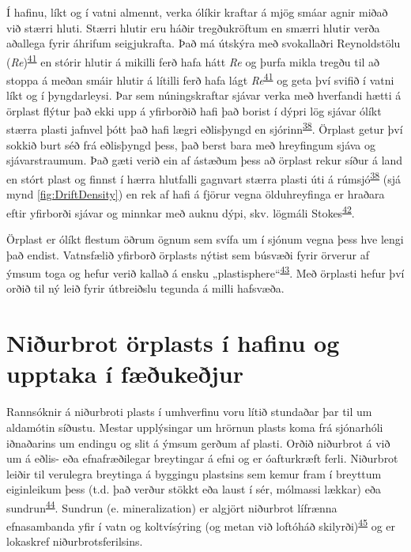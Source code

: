 \documentclass[icelandic,]{book}
\begin{document}
Í hafinu, líkt og í vatni almennt, verka ólíkir kraftar á mjög smáar agnir miðað við stærri hluti. Stærri hlutir eru háðir tregðukröftum en smærri hlutir verða aðallega fyrir áhrifum seigjukrafta. Það má útskýra með svokallaðri Reynoldstölu (\emph{Re})\textsuperscript{\protect\hyperlink{ref-levinton1995marine}{41}} en stórir hlutir á mikilli ferð hafa hátt \emph{Re} og þurfa mikla tregðu til að stoppa á meðan smáir hlutir á lítilli ferð hafa lágt \emph{Re}\textsuperscript{\protect\hyperlink{ref-levinton1995marine}{41}} og geta því svifið í vatni líkt og í þyngdarleysi. Þar sem núningskraftar sjávar verka með hverfandi hætti á örplast flýtur það ekki upp á yfirborðið hafi það borist í dýpri lög sjávar ólíkt stærra plasti jafnvel þótt það hafi lægri eðlisþyngd en sjórinn\textsuperscript{\protect\hyperlink{ref-isobe2014selective}{38}}. Örplast getur því sokkið burt séð frá eðlisþyngd þess, það berst bara með hreyfingum sjáva og sjávarstraumum. Það gæti verið ein af ástæðum þess að örplast rekur síður á land en stórt plast og finnst í hærra hlutfalli gagnvart stærra plasti úti á rúmsjó\textsuperscript{\protect\hyperlink{ref-isobe2014selective}{38}} (sjá mynd \ref{fig:DriftDensity}) en rek af hafi á fjörur vegna ölduhreyfinga er hraðara eftir yfirborði sjávar og minnkar með auknu dýpi, skv. lögmáli Stokes\textsuperscript{\protect\hyperlink{ref-stokes1851effect}{42}}.

Örplast er ólíkt flestum öðrum ögnum sem svífa um í sjónum vegna þess hve lengi það endist. Vatnsfælið yfirborð örplasts nýtist sem búsvæði fyrir örverur af ýmsum toga og hefur verið kallað á ensku „plastisphere``\textsuperscript{\protect\hyperlink{ref-Zettler2013}{43}}. Með örplasti hefur því orðið til ný leið fyrir útbreiðslu tegunda á milli hafsvæða.

\hypertarget{niurbrot-orplasts-i-hafinu-og-upptaka-i-fukejur}{%
\section*{Niðurbrot örplasts í hafinu og upptaka í fæðukeðjur}\label{niurbrot-orplasts-i-hafinu-og-upptaka-i-fukejur}}

Rannsóknir á niðurbroti plasts í umhverfinu voru lítið stundaðar þar til um aldamótin síðustu. Mestar upplýsingar um hrörnun plasts koma frá sjónarhóli iðnaðarins um endingu og slit á ýmsum gerðum af plasti.
Orðið niðurbrot á við um á eðlis- eða efnafræðilegar breytingar á efni og er óafturkræft ferli. Niðurbrot leiðir til verulegra breytinga á byggingu plastsins sem kemur fram í breyttum eiginleikum þess (t.d. það verður stökkt eða laust í sér, mólmassi lækkar) eða sundrun\textsuperscript{\protect\hyperlink{ref-ISO472}{44}}. Sundrun (e. mineralization) er algjört niðurbrot lífrænna efnasambanda yfir í vatn og koltvísýring (og metan við loftóháð skilyrði)\textsuperscript{\protect\hyperlink{ref-SameiginlegaEes-nefndin2007}{45}} og er lokaskref niðurbrotsferilsins.
\end{document}

